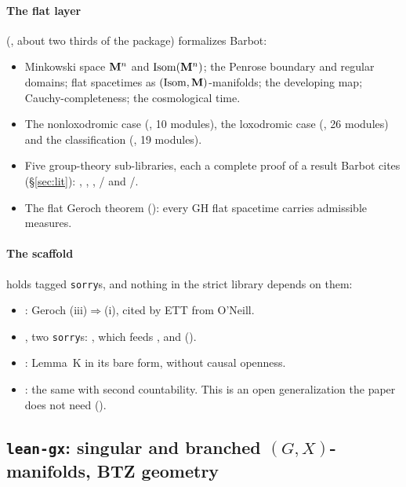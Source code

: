 \paragraph{The flat layer} (, about two thirds of the package) formalizes
Barbot:
\begin{itemize}
\item Minkowski space $\mathbf{M}^n$ and $\operatorname{Isom}(\mathbf{M}^n)$; the Penrose boundary and regular domains;
  flat spacetimes as $(\operatorname{Isom},\mathbf{M})$-manifolds; the developing map; Cauchy-completeness;
  the cosmological time.
\item The nonloxodromic case (, 10 modules), the loxodromic case
  (, 26 modules) and the classification (, 19 modules).
\item Five group-theory sub-libraries, each a complete proof of a result Barbot cites
  (\S\ref{sec:lit}): , , ,
  / and /.
\item The flat Geroch theorem (): every GH flat spacetime carries admissible
  measures.
\end{itemize}

\paragraph{The scaffold} holds \numPkgCausalSorryscaffold{} tagged \texttt{sorry}s, and nothing
in the strict library depends on them:
\begin{itemize}
\item {}: Geroch (iii)$\Rightarrow$(i), cited by ETT from O'Neill.
\item {}, two \texttt{sorry}s: , which feeds
  , and  ().
\item {}: Lemma~K in its bare form, without causal openness.
\item {}: the same with second countability. This is an open generalization the
  paper does not need ().
\end{itemize}

\subsection{\texttt{lean-gx}: singular and branched $(G,X)$-manifolds, BTZ geometry}

